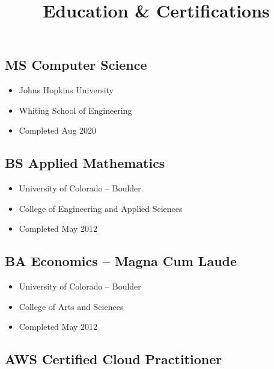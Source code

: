 \documentclass[
]{article}
\title{Education \& Certifications}
\author{}
\date{\vspace{-2.5em}}
\providecommand{\tightlist}{%
  \setlength{\itemsep}{0pt}\setlength{\parskip}{0pt}}
\begin{document}
\maketitle

\hypertarget{ms-computer-science}{%
\subsection{MS Computer Science}\label{ms-computer-science}}

\begin{itemize}
\tightlist
\item
  Johns Hopkins University
\item
  Whiting School of Engineering
\item
  Completed Aug 2020
\end{itemize}

\hypertarget{bs-applied-mathematics}{%
\subsection{BS Applied Mathematics}\label{bs-applied-mathematics}}

\begin{itemize}
\tightlist
\item
  University of Colorado -- Boulder
\item
  College of Engineering and Applied Sciences
\item
  Completed May 2012
\end{itemize}

\hypertarget{ba-economics-magna-cum-laude}{%
\subsection{BA Economics -- Magna Cum
Laude}\label{ba-economics-magna-cum-laude}}

\begin{itemize}
\tightlist
\item
  University of Colorado -- Boulder
\item
  College of Arts and Sciences
\item
  Completed May 2012
\end{itemize}

\hypertarget{aws-certified-cloud-practitioner}{%
\subsection{AWS Certified Cloud
Practitioner}\label{aws-certified-cloud-practitioner}}
\end{document}

